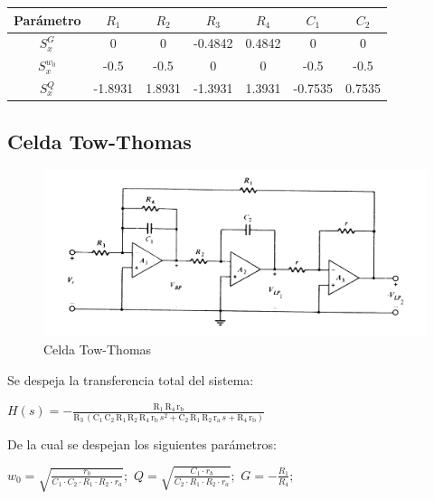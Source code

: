 \documentclass[../tc_tpfinal_main.tex]{subfiles}
\begin{document}
			 	\begin{table}[H] %
				\centering
 				\begin{tabular}{||c c c c c c c||} 
 					\hline
				  Parámetro& $R_1$ & $R_2$ & $R_3$ & $R_4$&$C_1$&$C_2$\\ [0.5ex] 
 					\hline\hline
					 $S^G_x$& 0& 0&-0.4842&0.4842&0&0\\
					 $S^{w_0}_x$& -0.5 &-0.5& 0& 0&-0.5&-0.5\\
					  $S^{Q}_x$& -1.8931 &1.8931&-1.3931& 1.3931&-0.7535&0.7535\\[1ex] 
					\hline
				\end{tabular}
			\end{table}
\subsection{Celda Tow-Thomas}

\begin{figure}[H]	
	\centering
	\includegraphics[scale=0.5]{imagenes/tow_thomas_circ.png}
	\caption{Celda Tow-Thomas}
	\label{fig:tpfinal_tow_thomas_circ}
\end{figure}

Se despeja la transferencia total del sistema:\par
\begin{center}
$H(s) = -\frac{\mathrm{R_1}\, \mathrm{R_4}\, \mathrm{r_b}}{\mathrm{R_3}\, \left(\mathrm{C_1}\, \mathrm{C_2}\, \mathrm{R_1}\, \mathrm{R_2}\, \mathrm{R_4}\, \mathrm{r_b}\, s^2 + \mathrm{C_2}\, \mathrm{R_1}\, \mathrm{R_2}\, \mathrm{r_a}\, s + \mathrm{R_4}\, \mathrm{r_b}\right)}
$
\end{center}

De la cual se despejan los siguientes parámetros:\par

\begin{center}
$w_0 = \sqrt{\frac{r_b}{C_1\cdot C_2\cdot R_1\cdot R_2\cdot r_a}}; $
$Q = \sqrt{\frac{C_1\cdot r_b}{C_2\cdot R_1\cdot R_2\cdot r_a}}; $
$G = -\frac{R_1}{R_4}; $ 
\end{center}
\end{document}
